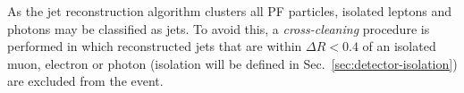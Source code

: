 
As the jet reconstruction algorithm clusters all PF particles, isolated leptons 
and photons may be classified as jets. To avoid this, a \textit{cross-cleaning} 
procedure is performed in which reconstructed jets that are within $\Delta R < 
0.4$ of an isolated muon, electron or photon (isolation will be defined in 
Sec.~\ref{sec:detector-isolation}) are excluded from the event.


